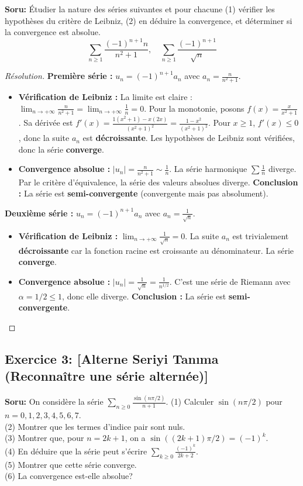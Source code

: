 \documentclass[12pt,a4paper]{report}
\begin{document}
\textbf{Soru:}
Étudier la nature des séries suivantes et pour chacune (1) vérifier les hypothèses du critère de Leibniz, (2) en déduire la convergence, et déterminer si la convergence est absolue.
\[ \sum_{n \ge 1} \frac{(-1)^{n+1} n}{n^2 + 1}, \quad \sum_{n \ge 1} \frac{(-1)^{n+1}}{\sqrt{n}} \]

\begin{proof}[Résolution]
\textbf{Première série :} $u_n = (-1)^{n+1} a_n$ avec $a_n = \frac{n}{n^2+1}$.
\begin{itemize}
    \item \textbf{Vérification de Leibniz :}
    La limite est claire : $\lim_{n \to +\infty} \frac{n}{n^2+1} = \lim_{n \to +\infty} \frac{1}{n} = 0$.
    Pour la monotonie, posons $f(x) = \frac{x}{x^2+1}$. Sa dérivée est $f'(x) = \frac{1(x^2+1) - x(2x)}{(x^2+1)^2} = \frac{1-x^2}{(x^2+1)^2}$. Pour $x \ge 1$, $f'(x) \le 0$, donc la suite $a_n$ est \textbf{décroissante}.
    Les hypothèses de Leibniz sont vérifiées, donc la série \textbf{converge}.
    \item \textbf{Convergence absolue :}
    $|u_n| = \frac{n}{n^2+1} \sim \frac{1}{n}$. La série harmonique $\sum \frac{1}{n}$ diverge. Par le critère d'équivalence, la série des valeurs absolues diverge. 
    \textbf{Conclusion :} La série est \textbf{semi-convergente} (convergente mais pas absolument).
\end{itemize}

\textbf{Deuxième série :} $u_n = (-1)^{n+1} a_n$ avec $a_n = \frac{1}{\sqrt{n}}$.
\begin{itemize}
    \item \textbf{Vérification de Leibniz :}
    $\lim_{n \to +\infty} \frac{1}{\sqrt{n}} = 0$. La suite $a_n$ est trivialement \textbf{décroissante} car la fonction racine est croissante au dénominateur. La série \textbf{converge}.
    \item \textbf{Convergence absolue :}
    $|u_n| = \frac{1}{\sqrt{n}} = \frac{1}{n^{1/2}}$. C'est une série de Riemann avec $\alpha = 1/2 \le 1$, donc elle diverge.
    \textbf{Conclusion :} La série est \textbf{semi-convergente}.
\end{itemize}
\end{proof}

\subsection*{Exercice 3: [Alterne Seriyi Tanıma (Reconnaître une série alternée)]}

\textbf{Soru:}
On considère la série $\sum_{n \ge 0} \frac{\sin(n\pi/2)}{n+1}$.
(1) Calculer $\sin(n\pi/2)$ pour $n = 0, 1, 2, 3, 4, 5, 6, 7$.\\
(2) Montrer que les termes d'indice pair sont nuls.\\
(3) Montrer que, pour $n = 2k + 1$, on a $\sin((2k + 1)\pi/2) = (-1)^k$.\\
(4) En déduire que la série peut s'écrire $\sum_{k \ge 0} \frac{(-1)^k}{2k + 2}$.\\
(5) Montrer que cette série converge.\\
(6) La convergence est-elle absolue?
\end{document}
